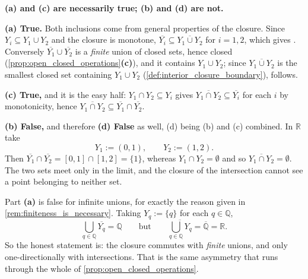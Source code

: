 \begin{exercisesolution}
\textbf{(a) and (c) are necessarily true; (b) and (d) are not.}

\textbf{(a) True.} Both inclusions come from general properties of the closure. Since
$Y_i \subseteq Y_1 \cup Y_2$ and the closure is monotone,
$\overline{Y_i} \subseteq \overline{Y_1\cup Y_2}$ for $i=1,2$, which gives \qt{$\supseteq$}.
Conversely $\overline{Y_1}\cup\overline{Y_2}$ is a \emph{finite} union of closed sets, hence
closed (\cref{prop:open_closed_operations}\textbf{(c)}), and it contains $Y_1\cup Y_2$; since
$\overline{Y_1\cup Y_2}$ is the smallest closed set containing $Y_1 \cup Y_2$
(\cref{def:interior_closure_boundary}), \qt{$\subseteq$} follows.

\textbf{(c) True,} and it is the easy half: $Y_1\cap Y_2 \subseteq Y_i$ gives
$\overline{Y_1\cap Y_2} \subseteq \overline{Y_i}$ for each $i$ by monotonicity, hence
$\overline{Y_1\cap Y_2} \subseteq \overline{Y_1}\cap\overline{Y_2}$.

\textbf{(b) False,} and therefore \textbf{(d) False} as well, (d) being (b) and (c) combined. In
$\mathbb{R}$ take
\[Y_1 := (0,1), \qquad Y_2 := (1,2).\]
Then $\overline{Y_1}\cap\overline{Y_2} = [0,1]\cap[1,2] = \{1\}$, whereas
$Y_1\cap Y_2 = \emptyset$ and so $\overline{Y_1\cap Y_2} = \emptyset$. The two sets meet only in
the limit, and the closure of the intersection cannot see a point belonging to neither set.

\begin{remark}
Part \textbf{(a)} is false for infinite unions, for exactly the reason given in
\cref{rem:finiteness_is_necessary}. Taking $Y_q := \{q\}$ for each $q \in \mathbb{Q}$,
\[\bigcup_{q\in\mathbb{Q}}\overline{Y_q} = \mathbb{Q}
  \qquad\text{but}\qquad
  \overline{\bigcup_{q\in\mathbb{Q}}Y_q} = \overline{\mathbb{Q}} = \mathbb{R}.\]
So the honest statement is: the closure commutes with \emph{finite} unions, and only
one-directionally with intersections. That is the same asymmetry that runs through the whole of
\cref{prop:open_closed_operations}.
\end{remark}
\end{exercisesolution}

